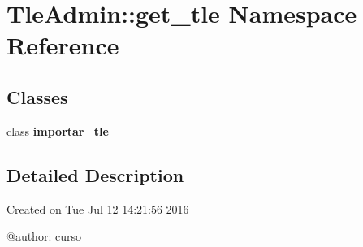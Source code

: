 \section{\-Tle\-Admin\-:\-:get\-\_\-tle \-Namespace \-Reference}
\label{namespace_tle_admin_1_1get__tle}
\subsection*{\-Classes}
\begin{DoxyCompactItemize}
\item 
class {\bf importar\-\_\-tle}
\end{DoxyCompactItemize}


\subsection{\-Detailed \-Description}
\begin{DoxyVerb}
Created on Tue Jul 12 14:21:56 2016

@author: curso
\end{DoxyVerb}
 